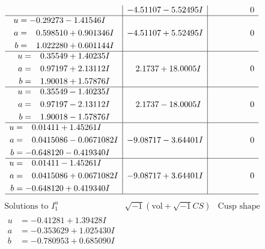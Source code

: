 \documentclass[1p]{elsarticle_modified}
\theoremstyle{definition}
\newcommand{\I}{\sqrt{-1}}
\begin{document}
$$\begin{array}{c|c|c}
 & -4.51107 - 5.52495 I & \phantom{-0.000000 } 0 \\ \hline\begin{aligned}
u &= -0.29273 - 1.41546 I \\
a &= \phantom{-}0.598510 + 0.901346 I \\
b &= \phantom{-}1.022280 + 0.601144 I\end{aligned}
 & -4.51107 + 5.52495 I & \phantom{-0.000000 } 0 \\ \hline\begin{aligned}
u &= \phantom{-}0.35549 + 1.40235 I \\
a &= \phantom{-}0.97197 + 2.13112 I \\
b &= \phantom{-}1.90018 + 1.57876 I\end{aligned}
 & \phantom{-}2.1737 + 18.0005 I & \phantom{-0.000000 } 0 \\ \hline\begin{aligned}
u &= \phantom{-}0.35549 - 1.40235 I \\
a &= \phantom{-}0.97197 - 2.13112 I \\
b &= \phantom{-}1.90018 - 1.57876 I\end{aligned}
 & \phantom{-}2.1737 - 18.0005 I & \phantom{-0.000000 } 0 \\ \hline\begin{aligned}
u &= \phantom{-}0.01411 + 1.45261 I \\
a &= \phantom{-}0.0415086 - 0.0671082 I \\
b &= -0.648120 - 0.419340 I\end{aligned}
 & -9.08717 - 3.64401 I & \phantom{-0.000000 } 0 \\ \hline\begin{aligned}
u &= \phantom{-}0.01411 - 1.45261 I \\
a &= \phantom{-}0.0415086 + 0.0671082 I \\
b &= -0.648120 + 0.419340 I\end{aligned}
 & -9.08717 + 3.64401 I & \phantom{-0.000000 } 0\\
 \hline 
 \end{array}$$\newpage$$\begin{array}{c|c|c}  
\text{Solutions to }I^u_{1}& \I (\text{vol} + \sqrt{-1}CS) & \text{Cusp shape}\\
 \hline 
\begin{aligned}
u &= -0.41281 + 1.39428 I \\
a &= -0.353629 + 1.025430 I \\
b &= -0.780953 + 0.685090 I\end{aligned}

\end{array}$$
\end{document}

